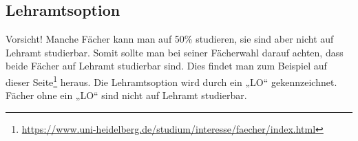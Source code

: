 %
%
%
%
%
%

\subsection{Lehramtsoption}
Vorsicht! Manche Fächer kann man auf 50\% studieren, sie sind aber nicht auf Lehramt studierbar. Somit sollte man bei seiner Fächerwahl darauf achten, dass beide Fächer auf Lehramt studierbar sind. Dies findet man zum Beispiel auf dieser Seite\footnote{\url{https://www.uni-heidelberg.de/studium/interesse/faecher/index.html}} heraus. Die Lehramts\-option wird durch ein „LO“ gekennzeichnet. Fächer ohne ein „LO“ sind nicht auf Lehramt studierbar.


